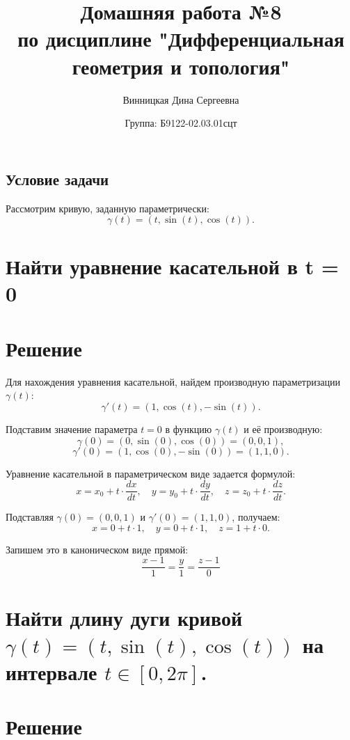 \documentclass{article}
\title{\vspace{-1cm}Домашняя работа №8 \\ по дисциплине "Дифференциальная геометрия и топология"}
\author{Винницкая Дина Сергеевна}
\date{Группа: Б9122-02.03.01сцт}
\begin{document}
	
	\maketitle


        \subsection*{Условие задачи}
        Рассмотрим кривую, заданную параметрически:
        \[
        \gamma(t) = (t, \sin(t), \cos(t)).
        \]
        \section{Найти уравнение касательной в t = 0}

        \section*{Решение}
        Для нахождения уравнения касательной, найдем производную параметризации \( \gamma(t) \):
        \[
        \gamma'(t) = \left(1, \cos(t), -\sin(t)\right).
        \]
        
        Подставим значение параметра \( t = 0 \) в функцию \( \gamma(t) \) и её производную:
        \[
        \gamma(0) = (0, \sin(0), \cos(0)) = (0, 0, 1),
        \]
        \[
        \gamma'(0) = \left(1, \cos(0), -\sin(0)\right) = (1, 1, 0).
        \]
        
        Уравнение касательной в параметрическом виде задается формулой:
        \[
        x = x_0 + t \cdot \frac{dx}{dt}, \quad
        y = y_0 + t \cdot \frac{dy}{dt}, \quad
        z = z_0 + t \cdot \frac{dz}{dt}.
        \]
        
        Подставляя \( \gamma(0) = (0, 0, 1) \) и \( \gamma'(0) = (1, 1, 0) \), получаем:
        \[
        x = 0 + t \cdot 1, \quad y = 0 + t \cdot 1, \quad z = 1 + t \cdot 0.
        \]
        
        Запишем это в каноническом виде прямой:
        \[
        \frac{x - 1}{1} = \frac{y}{1} = \frac{z - 1}{0}
        \]
        

        \section{Найти длину дуги кривой \( \gamma(t) = (t, \sin(t), \cos(t)) \) на интервале \( t \in [0, 2\pi] \).}
        \section*{Решение}
\end{document}
